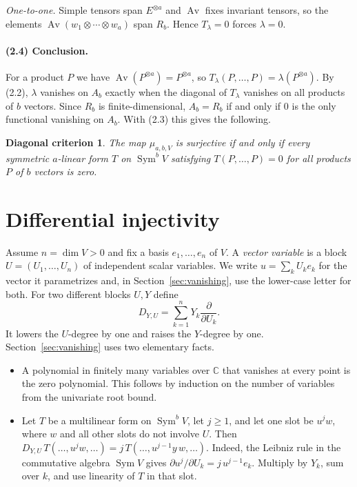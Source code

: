 \documentclass[11pt]{article}
\newtheorem*{criterion}{Diagonal criterion}
\theoremstyle{remark}
\DeclareMathOperator{\Sym}{Sym}
\DeclareMathOperator{\Av}{Av}
\newcommand{\C}{\mathbb C}
\newcommand{\D}[2]{D_{#1,#2}}
\begin{document}
\emph{One-to-one.} Simple tensors span $E^{\otimes a}$ and $\Av$ fixes
invariant tensors, so the elements $\Av(w_1\otimes\cdots\otimes w_a)$ span
$R_b$. Hence $T_\lambda=0$ forces $\lambda=0$.

\paragraph{(2.4) Conclusion.}
For a product $P$ we have $\Av(P^{\otimes a})=P^{\otimes a}$, so
$T_\lambda(P,\ldots,P)=\lambda(P^{\otimes a})$. By (2.2), $\lambda$
vanishes on $A_b$ exactly when the diagonal of $T_\lambda$ vanishes on all
products of $b$ vectors. Since $R_b$ is finite-dimensional, $A_b=R_b$ if and only if
$0$ is the only functional vanishing on $A_b$. With (2.3) this gives the
following.

\begin{criterion}
The map $\mu_{a,b,V}$ is surjective if and only if every symmetric
$a$-linear form $T$ on $\Sym^b V$ satisfying $T(P,\ldots,P)=0$ for all
products $P$ of $b$ vectors is zero.
\end{criterion}

\section{Differential injectivity}\label{sec:differential}

Assume $n=\dim V>0$ and fix a basis $e_1,\ldots,e_n$ of $V$. A \emph{vector
variable} is a block $U=(U_1,\ldots,U_n)$ of independent scalar variables.
We write $u=\sum_kU_ke_k$ for the vector it parametrizes and, in
Section~\ref{sec:vanishing}, use the lower-case letter for both. For two
different blocks $U,Y$ define
\[
 \D{Y}{U}=\sum_{k=1}^n Y_k\frac{\partial}{\partial U_k}.
\]
It lowers the $U$-degree by one and raises the $Y$-degree by one.
Section~\ref{sec:vanishing} uses two elementary facts.
\begin{itemize}[leftmargin=2.6em,itemsep=1pt,topsep=3pt]
\item[(D1)] A polynomial in finitely many variables over $\C$ that vanishes
at every point is the zero polynomial. This follows by induction on the
number of variables from the univariate root bound.
\item[(D2)] Let $T$ be a multilinear form on $\Sym^bV$, let $j\ge1$, and
let one slot be $u^jw$, where $w$ and all other slots do not involve $U$.
Then
$\D{Y}{U}\,T(\ldots,u^jw,\ldots)=j\,T(\ldots,u^{j-1}y\,w,\ldots)$.
Indeed, the Leibniz rule in the commutative algebra $\Sym V$ gives
$\partial u^j/\partial U_k=j\,u^{j-1}e_k$. Multiply by $Y_k$, sum over
$k$, and use linearity of $T$ in that slot.
\end{itemize}
\end{document}
